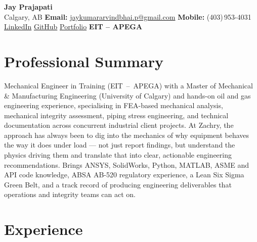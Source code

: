 \documentclass[10pt, letterpaper]{article}
\begin{document}
\pagestyle{empty}

\begin{center}
  {\LARGE\textbf{Jay Prajapati}}\\[4pt]
  {\small
    Calgary, AB
    \enspace\textbar\enspace
    \textbf{Email:}
    \href{mailto:jaykumararvindbhai.p@gmail.com}{jaykumararvindbhai.p@gmail.com}
    \enspace\textbar\enspace
    \textbf{Mobile:} (403)\,953-4031
    \enspace\textbar\enspace
    \href{https://linkedin.com/in/jaykumar-prajapati}{LinkedIn}
    \enspace\textbar\enspace
    \href{https://github.com/JayP309}{GitHub}
    \enspace\textbar\enspace
    \href{https://jayp309.github.io/jaykumar-prajapati/}{Portfolio}
    \enspace\textbar\enspace
    \textbf{EIT {--} APEGA}
  }
\end{center}

\vspace{-5pt}
\noindent\hspace*{0.8in}{\color{green}\rule{\dimexpr\linewidth-1.6in\relax}{2.5pt}}
\vspace{4pt}

\section*{Professional Summary}

Mechanical Engineer in Training (EIT~--~APEGA) with a Master of Mechanical \& Manufacturing Engineering (University of Calgary) and hands-on oil and gas engineering experience, specialising in FEA-based mechanical analysis, mechanical integrity assessment, piping stress engineering, and technical documentation across concurrent industrial client projects. At Zachry, the approach has always been to dig into the mechanics of why equipment behaves the way it does under load — not just report findings, but understand the physics driving them and translate that into clear, actionable engineering recommendations. Brings ANSYS, SolidWorks, Python, MATLAB, ASME and API code knowledge, ABSA AB-520 regulatory experience, a Lean Six Sigma Green Belt, and a track record of producing engineering deliverables that operations and integrity teams can act on.

\section*{Experience}
\end{document}
